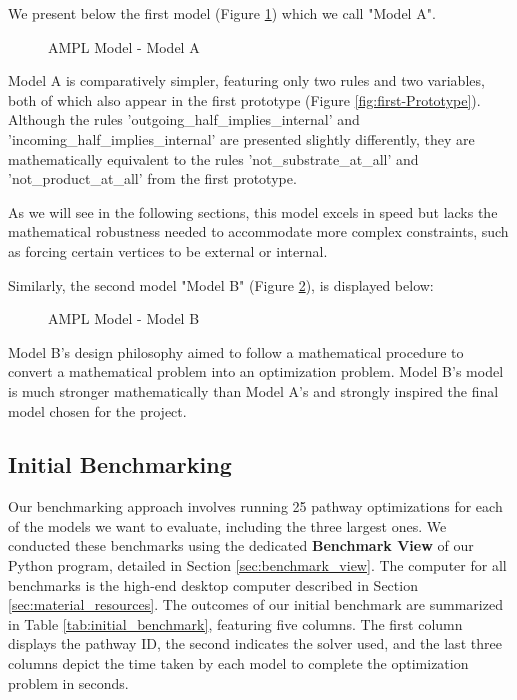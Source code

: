 We present below the first model (Figure \ref{fig:nasini}) which we call "Model A".

\begin{figure}[H]
    \centering
    \caption{AMPL Model - Model A}
    \label{fig:nasini}
\end{figure}

Model A is comparatively simpler, featuring only two rules and two variables, both of which also appear in the first prototype (Figure \ref{fig:first-Prototype}). Although the rules 'outgoing\_half\_implies\_internal' and 'incoming\_half\_implies\_internal' are presented slightly differently, they are mathematically equivalent to the rules 'not\_substrate\_at\_all' and 'not\_product\_at\_all' from the first prototype.

As we will see in the following sections, this model excels in speed but lacks the mathematical robustness needed to accommodate more complex constraints, such as forcing certain vertices to be external or internal.

Similarly, the second model "Model B" (Figure \ref{fig:valiente}), is displayed below:

\begin{figure}[H]
    \centering
    \caption{AMPL Model - Model B}
    \label{fig:valiente}
\end{figure}

Model B's design philosophy aimed to follow a mathematical procedure to convert a mathematical problem into an optimization problem. Model B's model is much stronger mathematically than Model A's and strongly inspired the final model chosen for the project.


\subsection{Initial Benchmarking}
Our benchmarking approach involves running 25 pathway optimizations for each of the models we want to evaluate, including the three largest ones. We conducted these benchmarks using the dedicated \textbf{Benchmark View} of our Python program, detailed in Section \ref{sec:benchmark_view}. The computer for all benchmarks is the high-end desktop computer described in Section \ref{sec:material_resources}. The outcomes of our initial benchmark are summarized in Table \ref{tab:initial_benchmark}, featuring five columns. The first column displays the pathway ID, the second indicates the solver used, and the last three columns depict the time taken by each model to complete the optimization problem in seconds.


